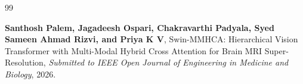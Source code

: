\newpage
\renewcommand{\bibname}{List of Publications}

\begin{thebibliography}{99}

{\bfseries Santhosh Palem, Jagadeesh Ospari, Chakravarthi Padyala, Syed Sameen Ahmad Rizvi, and Priya K V}, Swin-MMHCA: Hierarchical Vision Transformer with Multi-Modal Hybrid Cross Attention for Brain MRI Super-Resolution, {\em Submitted to IEEE Open Journal of Engineering in Medicine and Biology}, 2026.

\end{thebibliography}
